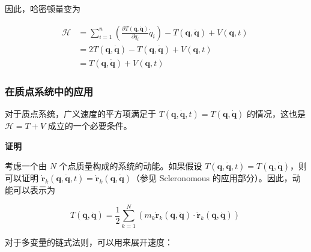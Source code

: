 因此，哈密顿量变为

\begin{equation}
\begin{aligned}
{\mathcal {H}} &= \sum_{i=1}^{n} \left( \frac{\partial T(\boldsymbol{q}, \boldsymbol{\dot{q}})}{\partial \dot{q}_{i}} \dot{q}_{i} \right) - T(\boldsymbol{q}, \boldsymbol{\dot{q}}) + V(\boldsymbol{q}, t) \\
&= 2T(\boldsymbol{q}, \boldsymbol{\dot{q}}) - T(\boldsymbol{q}, \boldsymbol{\dot{q}}) + V(\boldsymbol{q}, t)\\
&= T(\boldsymbol{q}, \boldsymbol{\dot{q}}) + V(\boldsymbol{q}, t)
\end{aligned}~
\end{equation}
\subsubsection{在质点系统中的应用}
对于质点系统，广义速度的平方项满足于 \( T(\mathbf{q}, \mathbf{\dot{q}}, t) = T(\mathbf{q}, \mathbf{\dot{q}}) \) 的情况，这也是 \( \mathcal{H} = T + V \) 成立的一个必要条件。

\textbf{证明}

考虑一个由 \( N \) 个点质量构成的系统的动能。如果假设 \( T(\boldsymbol{q}, \boldsymbol{\dot{q}}, t) = T(\boldsymbol{q}, \boldsymbol{\dot{q}}) \)，则可以证明 \( \dot{\mathbf{r}}_k(\boldsymbol{q}, \boldsymbol{\dot{q}}, t) = \dot{\mathbf{r}}_k(\boldsymbol{q}, \boldsymbol{\dot{q}}) \)（参见 Scleronomous 的应用部分）。因此，动能可以表示为

\[
T(\boldsymbol{q}, \boldsymbol{\dot{q}}) = \frac{1}{2} \sum_{k=1}^{N} \left( m_k \dot{\mathbf{r}}_k(\boldsymbol{q}, \boldsymbol{\dot{q}}) \cdot \dot{\mathbf{r}}_k(\boldsymbol{q}, \boldsymbol{\dot{q}}) \right)~
\]

对于多变量的链式法则，可以用来展开速度：

